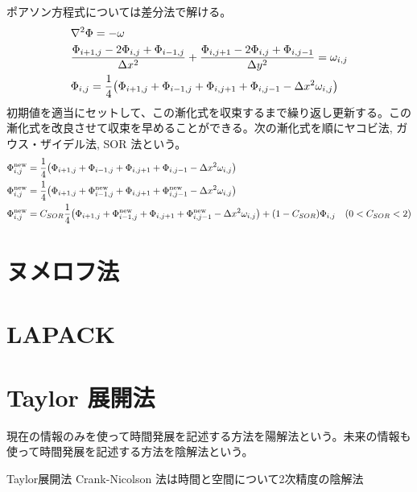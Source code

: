 \documentclass[uplatex,dvipdfmx,a4paper,11pt]{jlreq}
\theoremstyle{definition}
\begin{document}
\begin{theorem}
  ポアソン方程式については差分法で解ける。
  \begin{align}
     & \laplacian\Phi = - \omega                                                                                                                  \\
     & \frac{\Phi_{i+1,j} - 2\Phi_{i,j} + \Phi_{i-1,j}}{\Delta x^2} + \frac{\Phi_{i,j+1} - 2\Phi_{i,j} + \Phi_{i,j-1}}{\Delta y^2} = \omega_{i,j} \\
     & \Phi_{i,j} = \frac{1}{4}\qty(\Phi_{i+1,j} + \Phi_{i-1,j} + \Phi_{i,j+1} + \Phi_{i,j-1} - \Delta x^2\omega_{i,j})
  \end{align}
  初期値を適当にセットして、この漸化式を収束するまで繰り返し更新する。この漸化式を改良させて収束を早めることができる。次の漸化式を順にヤコビ法, ガウス・ザイデル法, SOR 法という。
  \begin{align}
    \Phi_{i,j}^{\mathrm{new}} & = \frac{1}{4}\qty(\Phi_{i+1,j} + \Phi_{i-1,j} + \Phi_{i,j+1} + \Phi_{i,j-1} - \Delta x^2\omega_{i,j})                                                                                    \\
    \Phi_{i,j}^{\mathrm{new}} & = \frac{1}{4}\qty(\Phi_{i+1,j} + \Phi_{i-1,j}^{\mathrm{new}} + \Phi_{i,j+1} + \Phi_{i,j-1}^{\mathrm{new}} - \Delta x^2\omega_{i,j})                                                      \\
    \Phi_{i,j}^{\mathrm{new}} & = C_{SOR}\frac{1}{4}\qty(\Phi_{i+1,j} + \Phi_{i-1,j}^{\mathrm{new}} + \Phi_{i,j+1} + \Phi_{i,j-1}^{\mathrm{new}} - \Delta x^2\omega_{i,j}) + (1 - C_{SOR})\Phi_{i,j} & (0 < C_{SOR} < 2)
  \end{align}
\end{theorem}

\section{ヌメロフ法}
\section{LAPACK}
\section{Taylor 展開法}
\begin{definition}
  現在の情報のみを使って時間発展を記述する方法を陽解法という。未来の情報も使って時間発展を記述する方法を陰解法という。
\end{definition}
\begin{definition}
  Taylor展開法
  Crank-Nicolson 法は時間と空間について2次精度の陰解法
\end{definition}
\end{document}
